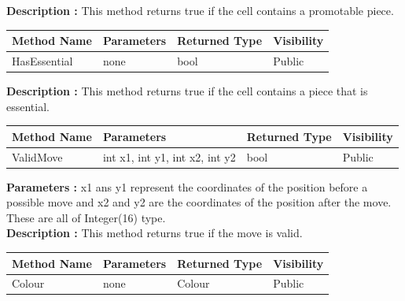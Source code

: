 \documentclass[12pt]{article}
\begin{document}
\textbf{Description :} This method returns true if the cell contains a promotable piece.

\begin{table}[H]
    \begin{tabular}{|l|l|l|l|}
    \hline
    \rowcolor[HTML]{EFEFEF} 
    \cellcolor[HTML]{EFEFEF}\textbf{Method Name} & \textbf{Parameters}     & \textbf{Returned Type} & \textbf{Visibility} \\ \hline
    HasEssential                                 & none                    & bool                   & Public              \\ \hline
    \end{tabular}
\end{table}

\textbf{Description :} This method returns true if the cell contains a piece that is essential.

\begin{table}[H]
    \begin{tabular}{|l|l|l|l|}
    \hline
    \rowcolor[HTML]{EFEFEF} 
    \cellcolor[HTML]{EFEFEF}\textbf{Method Name} & \textbf{Parameters}            & \textbf{Returned Type} & \textbf{Visibility} \\ \hline
    ValidMove                                    & int x1, int y1, int x2, int y2 & bool                   & Public              \\ \hline
    \end{tabular}
\end{table}

\textbf{Parameters :} x1 ans y1 represent the coordinates of the position before a possible move
and x2 and y2 are the coordinates of the position after the move. These are all of Integer(16) type.
\\

\textbf{Description :} This method returns true if the move is valid.

\begin{table}[H]
    \begin{tabular}{|l|l|l|l|}
    \hline
    \rowcolor[HTML]{EFEFEF} 
    \cellcolor[HTML]{EFEFEF}\textbf{Method Name} & \textbf{Parameters}     & \textbf{Returned Type} & \textbf{Visibility} \\ \hline
    Colour                                       & none                    & Colour                   & Public              \\ \hline
    \end{tabular}
\end{table}
\end{document}

